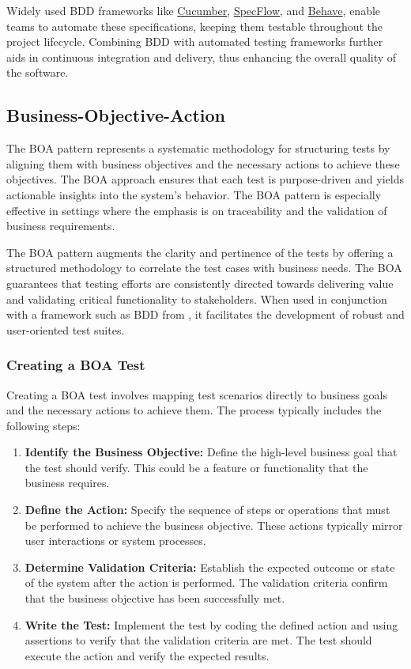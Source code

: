 Widely used \ac{BDD} frameworks like \href{https://cucumber.io}{Cucumber}, \href{https://specflow.org/}{SpecFlow}, and \href{https://behave.readthedocs.io/en/latest/#}{Behave}, enable teams to automate these specifications, keeping them testable throughout the project lifecycle. Combining \ac{BDD} with automated testing frameworks further aids in continuous integration and delivery, thus enhancing the overall quality of the software.

\subsection{Business-Objective-Action}

The \ac{BOA} pattern represents a systematic methodology for structuring tests by aligning them with business objectives and the necessary actions to achieve these objectives. The \ac{BOA} approach ensures that each test is purpose-driven and yields actionable insights into the system's behavior. The \ac{BOA} pattern is especially effective in settings where the emphasis is on traceability and the validation of business requirements. 

The \ac{BOA} pattern augments the clarity and pertinence of the tests by offering a structured methodology to correlate the test cases with business needs. The \ac{BOA} guarantees that testing efforts are consistently directed towards delivering value and validating critical functionality to stakeholders. When used in conjunction with a framework such as \ac{BDD} from , it facilitates the development of robust and user-oriented test suites.

\subsubsection{Creating a BOA Test}

Creating a \ac{BOA} test involves mapping test scenarios directly to business goals and the necessary actions to achieve them. The process typically includes the following steps:

\begin{enumerate}
    \item \textbf{Identify the Business Objective:} Define the high-level business goal that the test should verify. This could be a feature or functionality that the business requires.
    \item \textbf{Define the Action:} Specify the sequence of steps or operations that must be performed to achieve the business objective. These actions typically mirror user interactions or system processes.
    \item \textbf{Determine Validation Criteria:} Establish the expected outcome or state of the system after the action is performed. The validation criteria confirm that the business objective has been successfully met.
    \item \textbf{Write the Test:} Implement the test by coding the defined action and using assertions to verify that the validation criteria are met. The test should execute the action and verify the expected results.
\end{enumerate}

